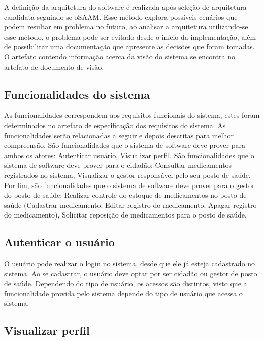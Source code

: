 %

A definição da arquitetura do software é realizada após seleção de arquitetura candidata seguindo-se o\acrfull{SAAM}. Esse método explora possíveis cenários que podem resultar em problema no futuro, ao analisar a arquitetura utilizando-se esse método, o problema pode ser evitado desde o início da implementação, além de possibilitar uma documentação que apresente as decisões que foram tomadas. O artefato contendo informação acerca da visão do sistema se encontra no artefato de documento de visão.

\subsection{Funcionalidades do sistema}

As funcionalidades correspondem aos requisitos funcionais do sistema, estes foram determinados no artefato de especificação dos requisitos do sistema. As funcionalidades serão relacionadas a seguir e depois descritas para melhor compreensão. São funcionalidades que o sistema de software deve prover para ambos os atores: Autenticar usuário, Visualizar perfil. São  funcionalidades que o sistema de software deve prover para o cidadão: Consultar medicamentos registrados no sistema, Visualizar o gestor responsável pelo seu posto de saúde. Por fim, são  funcionalidades que o sistema de software deve prover para o gestor do posto de saúde: Realizar controle do estoque de medicamentos no posto de saúde (Cadastrar medicamento; Editar registro do medicamento; Apagar registro do medicamento), Solicitar reposição de medicamentos para o posto de saúde.

\subsection{Autenticar o usuário}

O usuário pode realizar o login no sistema, desde que ele já esteja cadastrado no sistema. Ao se cadastrar, o usuário deve optar por ser cidadão ou gestor de posto de saúde. Dependendo do tipo de usuário, os acessos são distintos, visto que a funcionalidade provida pelo sistema depende do tipo de usuário que acessa o sistema.

\subsection{Visualizar perfil}

